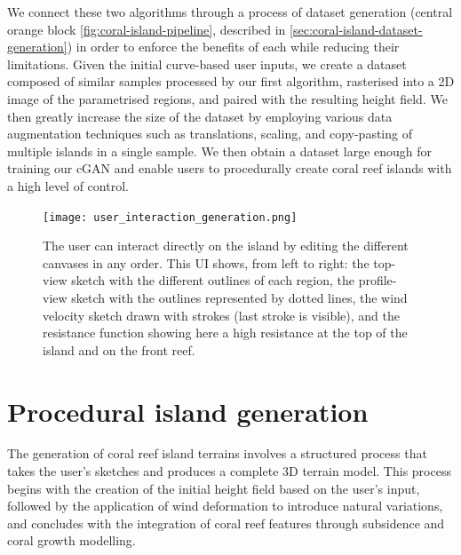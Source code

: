 We connect these two algorithms through a process of dataset generation (central orange block \cref{fig:coral-island-pipeline}, described in \cref{sec:coral-island-dataset-generation}) in order to enforce the benefits of each while reducing their limitations. Given the initial curve-based user inputs, we create a dataset composed of similar samples processed by our first algorithm, rasterised into a 2D image of the parametrised regions, and paired with the resulting height field. We then greatly increase the size of the dataset by employing various data augmentation techniques such as translations, scaling, and copy-pasting of multiple islands in a single sample. We then obtain a dataset large enough for training our cGAN and enable users to procedurally create coral reef islands with a high level of control.

\begin{figure}
\centering
\texttt{[image: user\_interaction\_generation.png]}
\caption{The user can interact directly on the island by editing the different canvases in any order. This UI shows, from left to right: the top-view sketch with the different outlines of each region, the profile-view sketch with the outlines represented by dotted lines, the wind velocity sketch drawn with strokes (last stroke is visible), and the resistance function showing here a high resistance at the top of the island and on the front reef.}
\label{fig:coral-island-wind-from-strokes-interaction}
\end{figure}


























\section{Procedural island generation}
\label{sec:coral-island-example-generation}

The generation of coral reef island terrains involves a structured process that takes the user's sketches and produces a complete 3D terrain model. This process begins with the creation of the initial height field based on the user's input, followed by the application of wind deformation to introduce natural variations, and concludes with the integration of coral reef features through subsidence and coral growth modelling.

